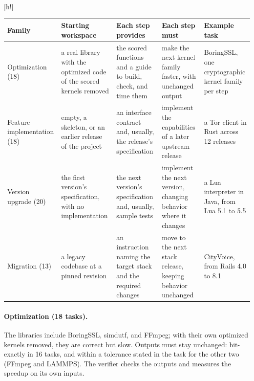 \documentclass{article}
\makeatletter
\renewenvironment{table}
  {\setlength{\abovecaptionskip}{\@abovecaptionskip}%
   \setlength{\belowcaptionskip}{\@belowcaptionskip}%
   \@float{table}}
  {\end@float}
\makeatother
\begin{document}
\begin{table}[h!]
  \centering
  \footnotesize
  \begin{tabularx}{\linewidth}{@{}>{\raggedright\arraybackslash}p{2.0cm} *{4}{>{\raggedright\arraybackslash}X}@{}}
    \toprule
    Family & Starting workspace & Each step provides & Each step must & Example task \\
    \midrule
    Optimization (18)
      & a real library with the optimized code of the scored kernels removed
      & the scored functions and a guide to build, check, and time them
      & make the next kernel family faster, with unchanged output
      & BoringSSL, one cryptographic kernel family per step \\
    \addlinespace
    Feature implementation (18)
      & empty, a skeleton, or an earlier release of the project
      & an interface contract and, usually, the release's specification
      & implement the capabilities of a later upstream release
      & a Tor client in Rust across 12 releases \\
    \addlinespace
    Version upgrade (20)
      & the first version's specification, with no implementation
      & the next version's specification and, usually, sample tests
      & implement the next version, changing behavior where it changes
      & a Lua interpreter in Java, from Lua 5.1 to 5.5 \\
    \addlinespace
    Migration (13)
      & a legacy codebase at a pinned revision
      & an instruction naming the target stack and the required changes
      & move to the next stack release, keeping behavior unchanged
      & CityVoice, from Rails 4.0 to 8.1 \\
    \bottomrule
  \end{tabularx}
  \caption{The four task families: where a task starts, what each step provides
    to the agent, what each step must achieve, and one example task.}
  \label{tab:families}
\end{table}

\paragraph{Optimization (18 tasks).}
The libraries include BoringSSL, simdutf, and FFmpeg; with their own optimized
kernels removed, they are correct but slow. Outputs must stay unchanged:
bit-exactly in 16 tasks, and within a tolerance stated in the task for the other two (FFmpeg and LAMMPS). The verifier checks the outputs and
measures the speedup on its own inputs.
\end{document}
